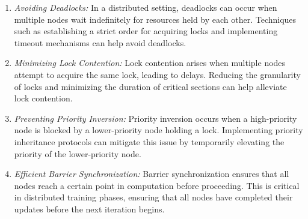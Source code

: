 \begin{enumerate}
    \item \emph{Avoiding Deadlocks:} In a distributed setting, deadlocks can occur when multiple nodes wait indefinitely for resources held by each
          other. Techniques such as establishing a strict order for acquiring locks and implementing timeout mechanisms can help
          avoid deadlocks.
    \item \emph{Minimizing Lock Contention:} Lock contention arises when multiple nodes attempt to acquire the same lock, leading to delays. Reducing
          the granularity of locks and minimizing the duration of critical sections can help alleviate lock contention.
    \item \emph{Preventing Priority Inversion:} Priority inversion occurs when a high-priority node is blocked by a lower-priority node holding a lock.
          Implementing priority inheritance protocols can mitigate this issue by temporarily elevating the priority of the
          lower-priority node.
    \item \emph{Efficient Barrier Synchronization:} Barrier synchronization ensures that all nodes reach a certain point in computation before proceeding.
          This is critical in distributed training phases, ensuring that all nodes have completed their updates before the next iteration begins.
\end{enumerate}

